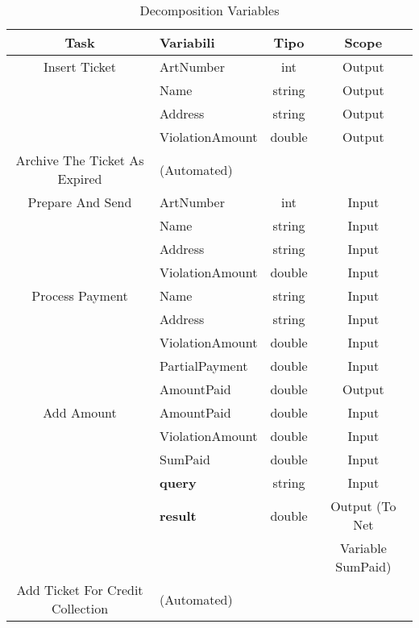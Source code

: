 \documentclass[../Relazione.tex]{subfiles}
\begin{document}
    \begin{table}[!h]
        \centering
        \begin{tabular}{|c|l|c|c|}
            \hline
            \textbf{Task} & \textbf{Variabili} & \textbf{Tipo} & \textbf{Scope} \\
            \hline
            Insert Ticket & ArtNumber & int & Output \\
                          & Name & string & Output \\
                          & Address & string & Output \\
                          & ViolationAmount & double & Output \\
            \hline
            Archive The Ticket As Expired & (Automated) & & \\
            \hline
            Prepare And Send & ArtNumber & int & Input \\
                          & Name & string & Input \\
                          & Address & string & Input \\
                          & ViolationAmount & double & Input \\
            \hline
            Process Payment & Name & string & Input \\
                            & Address & string & Input \\
                            & ViolationAmount & double & Input \\
                            & PartialPayment & double & Input \\
                            & AmountPaid & double & Output \\
            \hline
            Add Amount & AmountPaid & double & Input \\
                       & ViolationAmount & double & Input \\
                       & SumPaid & double & Input \\
                       & \textbf{query} & string & Input \\
                       & \textbf{result} & double & Output (To Net \\
                       & & & Variable SumPaid)\\
           \hline
           Add Ticket For Credit Collection & (Automated) & & \\
           \hline
        \end{tabular}
        \caption{Decomposition Variables}
        \label{tab:vars}
    \end{table}
    
\end{document}
